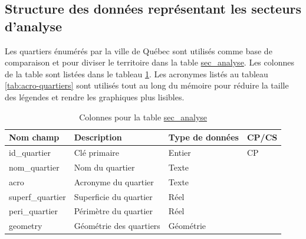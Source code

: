     \subsection{Structure des données représentant les secteurs d'analyse}\label{ssec:struct_donnees_sec_analyse}
        Les quartiers énumérés par la ville de Québec sont utilisés comme base de comparaison et pour diviser le territoire dans la table \ul{sec\_analyse}. Les colonnes de la table sont listées dans le tableau \ref{tab:definition_sec_analyse}. Les acronymes listés au tableau \ref{tab:acro-quartiers} sont utilisés tout au long du mémoire pour réduire la taille des légendes et rendre les graphiques plus lisibles.
        \begin{table}[h]
            \caption{Colonnes pour la table \underline{sec\_analyse}}
            \label{tab:definition_sec_analyse}
            \centering
            \begin{tabular}{m{}|m{}m{}m{}}
                \hline
                Nom champ & Description & Type de données & CP/CS  \\
                \hline
                id\_quartier & Clé primaire & Entier & CP \\
                nom\_quartier & Nom du quartier & Texte & \\
                acro & Acronyme du quartier & Texte & \\ 
                superf\_quartier & Superficie du quartier & Réel & \\
                peri\_quartier & Périmètre du quartier & Réel & \\
                geometry & Géométrie des quartiers & Géométrie & \\
                \hline
           \end{tabular}
           
        \end{table}   
        \newcommand{\TitreAcronymesQuartiers}{Acronymes affectés aux quartiers}
